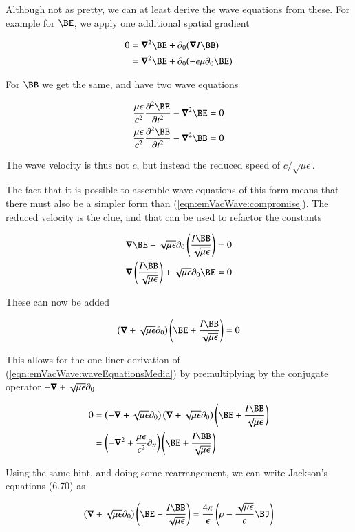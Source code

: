 Although not as pretty, we can at least derive the wave equations from these.  For example for $\BE$, we apply one additional spatial gradient

\begin{align*}
0 
&= \spacegrad^2 \BE + \partial_0 (\spacegrad I \BB) \\
&= \spacegrad^2 \BE + \partial_0 ( -\epsilon \mu \partial_0 \BE ) \\
\end{align*}

For $\BB$ we get the same, and have two wave equations

\begin{align}\label{eqn:emVacWave:waveEquationsMedia}
\frac{\mu \epsilon}{c^2} \frac{\partial^2 \BE}{\partial t^2} - \spacegrad^2 \BE &= 0 \\
\frac{\mu \epsilon}{c^2} \frac{\partial^2 \BB}{\partial t^2} - \spacegrad^2 \BB &= 0
\end{align}

The wave velocity is thus not $c$, but instead the reduced speed of $c/{\sqrt{\mu\epsilon}}$.

The fact that it is possible to assemble wave equations of this form means that there must also be a simpler form than (\ref{eqn:emVacWave:compromise}).  The reduced velocity is the clue, and that can be used to refactor the constants

\begin{align*}
\spacegrad \BE + \sqrt{\mu\epsilon}\partial_0 \left(\frac{I\BB}{\sqrt{\mu\epsilon}}\right) &= 0 \\
\spacegrad \left(\frac{I \BB}{\sqrt{\mu\epsilon}}\right) + \sqrt{\mu\epsilon} \partial_0 \BE &= 0 
\end{align*}

These can now be added

\begin{align}
\left(\spacegrad + \sqrt{\mu\epsilon} \partial_0\right)\left(\BE + \frac{I\BB}{\sqrt{\mu\epsilon}}\right) = 0
\end{align}

This allows for the one liner derivation of (\ref{eqn:emVacWave:waveEquationsMedia}) by premultiplying by the conjugate
operator $-\boldsymbol{\nabla} + \sqrt{\mu\epsilon} \partial_0$

\begin{align*}
0 
&=
\left(-\spacegrad + \sqrt{\mu\epsilon} \partial_0\right)
\left(\spacegrad + \sqrt{\mu\epsilon} \partial_0\right)
\left(\BE + \frac{I\BB}{\sqrt{\mu\epsilon}}\right) \\
&=
\left(-\spacegrad^2 + \frac{\mu\epsilon}{c^2} \partial_{tt}\right)
\left(\BE + \frac{I\BB}{\sqrt{\mu\epsilon}}\right) 
\end{align*}

Using the same hint, and doing some rearrangement, we can write Jackson's equations (6.70) as

\begin{align}\label{eqn:emVacWave:maxwellEquationMedia}
\left(\spacegrad + \sqrt{\mu\epsilon} \partial_0\right)\left(\BE + \frac{I\BB}{\sqrt{\mu\epsilon}}\right) = 
\frac{4\pi}{\epsilon}\left( \rho - \frac{\sqrt{\mu\epsilon}}{c}\BJ \right)
\end{align}

\EndArticle
